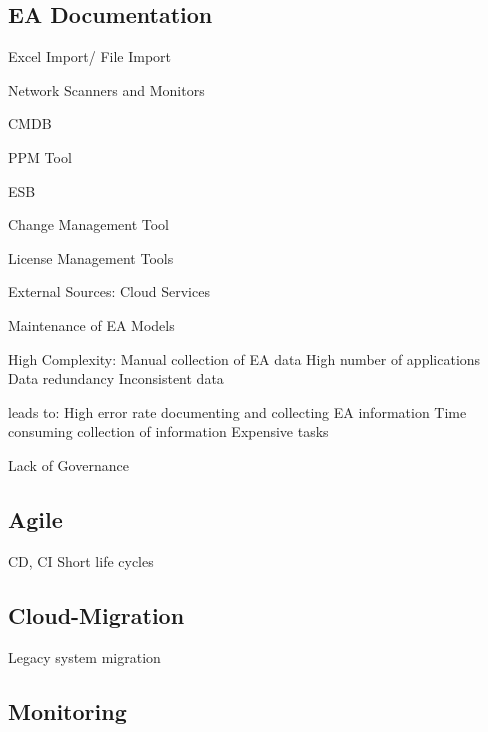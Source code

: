 \subsection{EA Documentation}



Excel Import/ File Import

Network Scanners and Monitors

CMDB

PPM Tool

ESB

Change Management Tool

License Management Tools

External Sources: Cloud Services


Maintenance of EA Models

High Complexity: Manual collection of EA data
High number of applications
Data redundancy
Inconsistent data

leads to: High error rate documenting and collecting EA information
Time consuming collection of information
Expensive tasks


Lack of Governance





\subsection{Agile}
CD, CI
Short life cycles

\subsection{Cloud-Migration}

Legacy system migration

\subsection{Monitoring}


